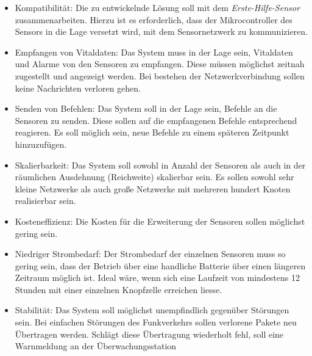     \begin{itemize}
        \item{Kompatibilität:} Die zu entwickelnde Lösung soll mit dem \emph{Erste-Hilfe-Sensor}
                               zusammenarbeiten. Hierzu ist es erforderlich, dass der Mikrocontroller
                               des Sensors in die Lage versetzt wird, mit dem Sensornetzwerk zu
                               kommunizieren.
        \item{Empfangen von Vitaldaten:} Das System muss in der Lage sein, Vitaldaten und Alarme  
                                         von den Sensoren zu empfangen. Diese müssen möglichst zeitnah
                                         zugestellt und angezeigt werden. Bei bestehen der Netzwerkverbindung
                                         sollen keine Nachrichten verloren gehen. 
        \item{Senden von Befehlen:} Das System soll in der Lage sein, Befehle an die Sensoren zu senden.
                                    Diese sollen auf die empfangenen Befehle entsprechend reagieren. Es
                                    soll möglich sein, neue Befehle zu einem späteren Zeitpunkt hinzuzufügen.
        \item{Skalierbarkeit:} Das System soll sowohl in Anzahl der Sensoren als auch in der räumlichen 
                               Ausdehnung (Reichweite) skalierbar sein. Es sollen sowohl sehr kleine Netzwerke
                               als auch große Netzwerke mit mehreren hundert Knoten realisierbar sein.
        \item{Kosteneffizienz:} Die Kosten für die Erweiterung der Sensoren sollen möglichst gering sein.
        \item{Niedriger Strombedarf:} Der Strombedarf der einzelnen Sensoren muss so gering sein, dass
                                         der Betrieb über eine handliche Batterie über einen längeren 
                                         Zeitraum möglich ist. Ideal wäre, wenn sich eine Laufzeit von
                                         mindestens 12 Stunden mit einer einzelnen Knopfzelle erreichen
                                         liesse.
        \item{Stabilität:} Das System soll möglichst unempfindlich gegenüber Störungen sein. Bei einfachen
                           Störungen des Funkverkehrs sollen verlorene Pakete neu Übertragen werden.
                           Schlägt diese Übertragung wiederholt fehl, soll eine Warnmeldung an der Überwachungsstation 

\end{itemize}
